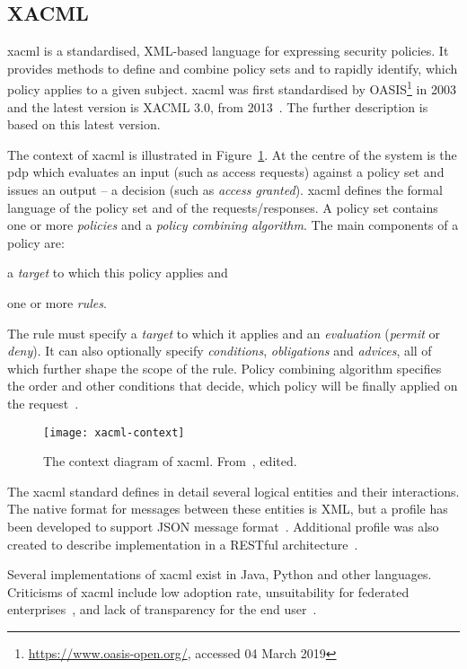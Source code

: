 \subsection{XACML}\label{sec:xacml}

 \acrfull{xacml} is a standardised, XML-based language for expressing security policies. It provides methods to define and combine policy sets and to rapidly identify, which policy applies to a given subject. \acrshort{xacml} was first standardised by OASIS\footnote{\url{https://www.oasis-open.org/}, accessed 04 March 2019} in 2003 and the latest version is XACML 3.0, from 2013~\cite{OASISStandard2013EXtensible3.0}. The further description is based on this latest version.
 
The context of \acrshort{xacml} is illustrated in Figure~\ref{fig:xacml-context}. At the centre of the system is the \acrfull{pdp} which evaluates an input (such as access requests) against a policy set and issues an output -- a decision (such as \textit{access granted}). \acrshort{xacml} defines the formal language of the policy set and of the requests/responses. A policy set contains one or more \textit{policies} and a \textit{policy combining algorithm}. The main components of a policy are:
% 
\begin{enumerate*}[label=(\roman*)]
    \item a \textit{target} to which this policy applies and
    \item one or more \textit{rules}.
\end{enumerate*} 
% 
The rule must specify a \textit{target} to which it applies and an \textit{evaluation} (\textit{permit} or \textit{deny}). It can also optionally specify \textit{conditions}, \textit{obligations} and \textit{advices}, all of which further shape the scope of the rule. Policy combining algorithm specifies the order and other conditions that decide, which policy will be finally applied on the request~\cite{OASISStandard2013EXtensible3.0}.
 
 \begin{figure}[ht]
    \centering
    \texttt{[image: xacml-context]}
    \caption{The context diagram of \acrshort{xacml}. From~\cite{OASISStandard2013EXtensible3.0}, edited.
    }
    \label{fig:xacml-context}
\end{figure}
 
The \acrshort{xacml} standard defines in detail several logical entities and their interactions. The native format for messages between these entities is XML, but a profile has been developed to support JSON message format~\cite{2017JSON1.0}. Additional profile was also created to describe implementation in a RESTful architecture~\cite{2017REST1.0}.
 
 Several implementations of \acrshort{xacml} exist in Java, Python and other languages. Criticisms of \acrshort{xacml} include low adoption rate, unsuitability for federated enterprises~\cite{Cser2013XACMLDead}, and lack of transparency for the end user~\cite{Cser2013XACMLDead, Ardagna2011ExpressiveApplications}.

